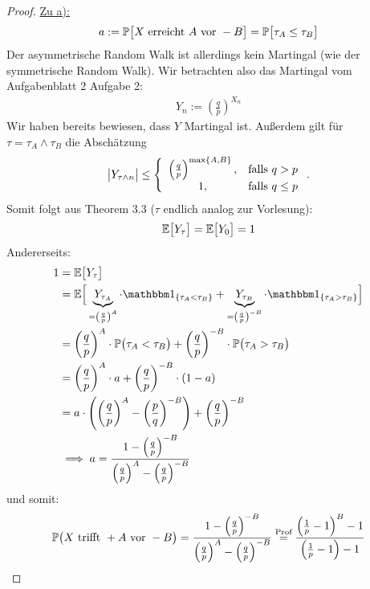 \begin{proof}
	\underline{Zu a):}
	\begin{align*}
		a:=\P\big[ X\text{ erreicht }A\text{ vor }-B\big]=\P\big[\tau_A\leq\tau_B\big]
	\end{align*}
	Der asymmetrische Random Walk ist allerdings kein Martingal (wie der symmetrische Random Walk). 
	Wir betrachten also das Martingal vom Aufgabenblatt 2 Aufgabe 2:
	\begin{align*}
		Y_n := \left(\frac{q}{p}\right)^{X_n}
	\end{align*}
	Wir haben bereits bewiesen, dass $Y$ Martingal ist. 
	Außerdem gilt für\\
	$\tau=\tau_A\wedge\tau_B$ die Abschätzung
	\begin{align*}
		\big|Y_{\tau\wedge n}\big|\leq
		\left\lbrace\begin{array}{cl}
			\left(\frac{q}{p}\right)^{\max\lbrace A,B\rbrace}, &\falls q>p\\
			1, &\falls q\leq p
		\end{array}\right..
	\end{align*}
	Somit folgt aus Theorem 3.3 ($\tau$ endlich analog zur Vorlesung):
	\begin{align*}
		\E\big[Y_\tau\big]=\E\big[Y_0\big]=1
	\end{align*}
	Andererseits: 
	\begin{align*}
		1&=\E\big[Y_\tau\big]\\
		&=\E\Big[\underbrace{Y_{\tau_A}}_{=\left(\frac{q}{p}\right)^A}\cdot\indi_{\lbrace\tau_A<\tau_B\rbrace}+\underbrace{Y_{\tau_B}}_{=\left(\frac{q}{p}\right)^{-B}}\cdot\indi_{\lbrace\tau_A>\tau_B\rbrace}\Big]\\
		&=\left(\frac{q}{p}\right)^A\cdot\P\big(\tau_A<\tau_B\big)+\left(\frac{q}{p}\right)^{-B}\cdot\P\big(\tau_A>\tau_B\big)\\
		&=\left(\frac{q}{p}\right)^A\cdot a+ \left(\frac{q}{p}\right)^{-B}\cdot(1-a)\\
		&=a\cdot\left(\left(\frac{q}{p}\right)^A - \left(\frac{p}{q}\right)^{-B}\right)+ \left(\frac{q}{p}\right)^{-B}\\
		&\implies
		a=\frac{1-\left(\frac{q}{p}\right)^{-B}}{\left(\frac{q}{p}\right)^A-\left(\frac{q}{p}\right)^{-B}}
	\end{align*}
	und somit:
	\begin{align*}
		\P\big(X\text{ trifft }+A\text{ vor }-B\big)
		=\frac{1-\left(\frac{q}{p}\right)^{-B}}{\left(\frac{q}{p}\right)^A-\left(\frac{q}{p}\right)^{-B}}
		\overset{\text{Prof}}=
		\frac{\left(\frac{1}{p}-1\right)^B-1}{\left(\frac{1}{p}-1\right)-1}
	\end{align*}


\end{proof}
